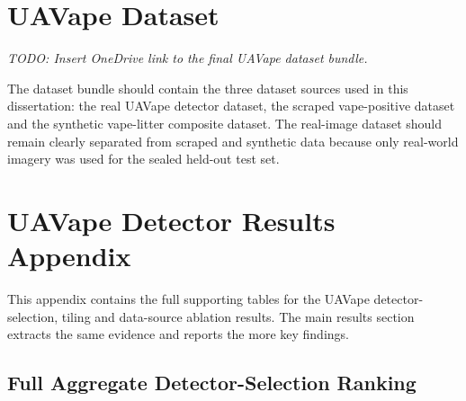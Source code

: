 \section{UAVape Dataset}
\label{app:uavape_dataset_bundle}
\textit{TODO: Insert OneDrive link to the final UAVape dataset bundle.}

The dataset bundle should contain the three dataset sources used in this dissertation: the real UAVape detector dataset, the scraped vape-positive dataset and the synthetic vape-litter composite dataset. The real-image dataset should remain clearly separated from scraped and synthetic data because only real-world imagery was used for the sealed held-out test set.
\section{UAVape Detector Results Appendix}
\label{app:uavape_results_full_tables}

This appendix contains the full supporting tables for the UAVape detector-selection, tiling and data-source ablation results. The main results section extracts the same evidence and reports the more key findings.

\subsection{Full Aggregate Detector-Selection Ranking}

